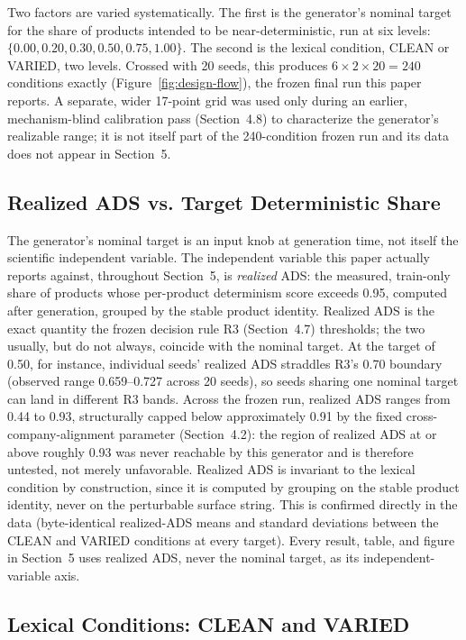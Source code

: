 \documentclass[11pt]{article}
\begin{document}
Two factors are varied systematically. The first is the generator's nominal
target for the share of products intended to be near-deterministic, run at
six levels: $\{0.00, 0.20, 0.30, 0.50, 0.75, 1.00\}$. The second is the
lexical condition, CLEAN or VARIED, two levels. Crossed with 20 seeds, this
produces $6 \times 2 \times 20 = 240$ conditions exactly (Figure~\ref{fig:design-flow}), the frozen final
run this paper reports. A separate, wider 17-point grid was used only during
an earlier, mechanism-blind calibration pass (Section~4.8) to characterize
the generator's realizable range; it is not itself part of the 240-condition
frozen run and its data does not appear in Section~5.

\subsection{Realized ADS vs. Target Deterministic Share}
\label{sec:realized-ads}

The generator's nominal target is an input knob at generation time, not
itself the scientific independent variable. The independent variable this
paper actually reports against, throughout Section~5, is \emph{realized}
ADS: the measured, train-only share of products whose per-product
determinism score exceeds 0.95, computed after generation, grouped by the
stable product identity. Realized ADS is the exact quantity the frozen
decision rule R3 (Section~4.7) thresholds; the two usually, but do not
always, coincide with the nominal target. At the target of 0.50, for
instance, individual seeds' realized ADS straddles R3's 0.70 boundary
(observed range 0.659--0.727 across 20 seeds), so seeds sharing one nominal
target can land in different R3 bands. Across the frozen run, realized ADS
ranges from 0.44 to 0.93, structurally capped below approximately 0.91 by the
fixed cross-company-alignment parameter (Section~4.2): the region of
realized ADS at or above roughly 0.93 was never reachable by this generator
and is therefore untested, not merely unfavorable. Realized ADS is invariant
to the lexical condition by construction, since it is computed by grouping on
the stable product identity, never on the perturbable surface string. This
is confirmed directly in the data (byte-identical realized-ADS means and
standard deviations between the CLEAN and VARIED conditions at every target).
Every result, table, and figure in Section~5 uses realized ADS, never the
nominal target, as its independent-variable axis.

\subsection{Lexical Conditions: CLEAN and VARIED}
\label{sec:lexical-conditions}
\end{document}
